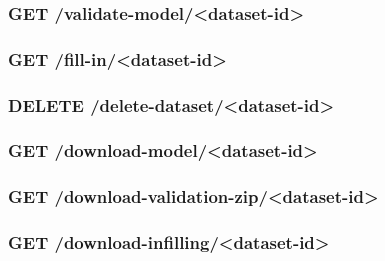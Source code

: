 \subsubsection*{GET /validate-model/<dataset-id>}

\subsubsection*{GET /fill-in/<dataset-id>}

\subsubsection*{DELETE /delete-dataset/<dataset-id>}

\subsubsection*{GET /download-model/<dataset-id>}

\subsubsection*{GET /download-validation-zip/<dataset-id>}

\subsubsection*{GET /download-infilling/<dataset-id>}
